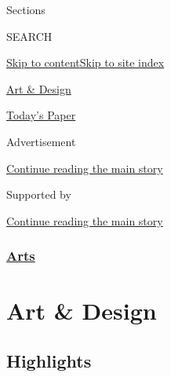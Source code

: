 Sections

SEARCH

\protect\hyperlink{site-content}{Skip to
content}\protect\hyperlink{site-index}{Skip to site index}

\href{https://www.nytimes3xbfgragh.onion/section/arts/design}{Art \&
Design}

\href{https://myaccount.nytimes3xbfgragh.onion/auth/login?response_type=cookie\&client_id=vi}{}

\href{https://www.nytimes3xbfgragh.onion/section/todayspaper}{Today's
Paper}

Advertisement

\protect\hyperlink{after-top}{Continue reading the main story}

Supported by

\protect\hyperlink{after-sponsor}{Continue reading the main story}

\hypertarget{arts}{%
\subsubsection{\texorpdfstring{\href{/section/arts}{Arts}}{Arts}}\label{arts}}

\hypertarget{art--design}{%
\section{Art \& Design}\label{art--design}}

\hypertarget{highlights}{%
\subsection{Highlights}\label{highlights}}

